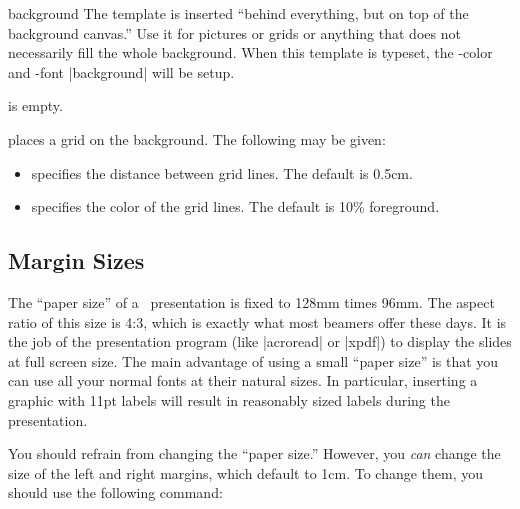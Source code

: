 \begin{element}{background}\yes\yes\yes
  The template is inserted ``behind everything, but on top of the
  background canvas.'' Use it for pictures or grids or anything that
  does not necessarily fill the whole background. When this template
  is typeset, the \beamer-color and -font |background| will be
  setup.

  \begin{templateoptions}
     is empty.
    
    places a grid on the background. The following
     may be given:
    \begin{itemize}
    \item {} specifies the distance
      between grid lines. The default is 0.5cm.
    \item {} specifies the color of the
      grid lines. The default is 10\% foreground.
    \end{itemize}
  \end{templateoptions}  
\end{element}




\subsection{Margin Sizes}

The ``paper size'' of a \beamer\ presentation is fixed to 128mm times
96mm. The aspect ratio of this size is 4:3, which is exactly what most
beamers offer these days. It is the job of the
presentation program (like |acroread| or |xpdf|) to display the slides
at full screen size. The main advantage of using a small ``paper size''
is that you can use all your normal fonts at their natural sizes. In
particular, inserting a graphic with 11pt labels will result in
reasonably sized labels during the presentation.

You should refrain from changing the ``paper size.'' However, you
\emph{can} change the size of the left and right margins, which
default to 1cm. To change them, you should use the following 
command:

